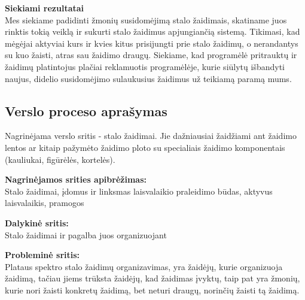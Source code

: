 \documentclass{VUMIFPSkursinis}
\begin{document}
\textbf{Siekiami rezultatai}\\
Mes siekiame padidinti žmonių susidomėjimą stalo žaidimais, skatiname juos rinktis tokią veiklą 
ir sukurti stalo žaidimus apjungiančią sistemą. Tikimasi, kad mėgėjai aktyviai kurs ir kvies 
kitus prisijungti prie stalo žaidimų, o nerandantys su kuo žaisti, atras sau žaidimo draugų. 
Siekiame, kad programėlė pritrauktų ir žaidimų platintojus plačiai reklamuotis programėlėje, 
kurie siūlytų išbandyti naujus, didelio susidomėjimo sulaukusius žaidimus už teikiamą paramą mums.

\subsection{Verslo proceso aprašymas}
Nagrinėjama verslo sritis - stalo žaidimai. Jie dažniausiai žaidžiami ant žaidimo 
lentos ar kitaip pažymėto žaidimo ploto su specialiais žaidimo komponentais 
(kauliukai, figūrėlės, kortelės).

\textbf{Nagrinėjamos srities apibrėžimas:}\\
Stalo žaidimai, įdomus ir linksmas laisvalaikio praleidimo būdas, aktyvus 
laisvalaikis, pramogos

\textbf{Dalykinė sritis:}\\
Stalo žaidimai ir pagalba juos organizuojant

\textbf{Probleminė sritis:}\\
Plataus spektro stalo žaidimų organizavimas, yra žaidėjų, kurie organizuoja 
žaidimą, tačiau jiems trūksta žaidėjų, kad žaidimas įvyktų, taip pat yra žmonių, 
kurie nori žaisti konkretų žaidimą, bet neturi draugų, norinčių žaisti tą žaidimą.
\end{document}

